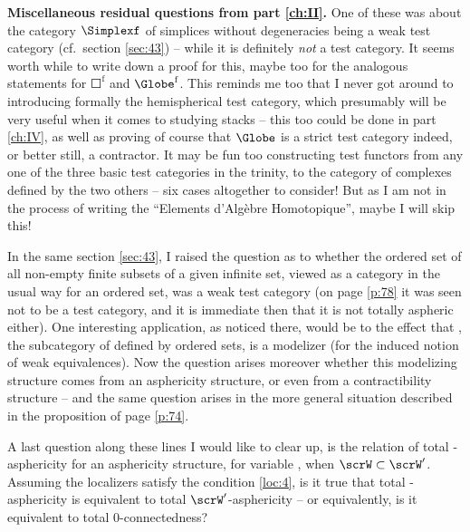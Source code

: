 \enspace\textbf{Miscellaneous residual
  questions from part \ref{ch:II}.} One of these was about the category
$\Simplexf$ of simplices without degeneracies being a weak test
category (cf.\ section \ref{sec:43}) -- while it is definitely
\emph{not} a test category. It seems worth while to write down a proof
for this, maybe too for the analogous statements for
$\Square^{\mathrm f}$ and $\Globe^{\mathrm f}$. This reminds
me too that I never got around to introducing formally the
hemispherical test category, which presumably will be very useful when
it comes to studying stacks -- this too could be done in part
\ref{ch:IV}, as well as proving of course that $\Globe$ is a strict
test category indeed, or better still, a contractor. It may be fun too
constructing test functors from any one of the three basic test
categories in the trinity, to the category of complexes defined by the
two others -- six cases altogether to consider! But as I am not in the
process of writing the ``Elements d'Algèbre
Homotopique'', maybe I will skip this!

In the same section \ref{sec:43}, I raised the question as to whether
the ordered set of all non-empty finite subsets of a given infinite
set, viewed as a category in the usual way for an ordered set, was a
weak test category (on page \ref{p:78} it was seen not to be a test
category, and it is immediate then that it is not totally aspheric
either). One interesting application, as noticed there, would be to
the effect that \Ord, the subcategory of \Cat{} defined by ordered
sets, is a modelizer (for the induced notion of weak
equivalences). Now the question arises moreover whether this
modelizing structure comes from an asphericity structure, or even from
a contractibility structure -- and the same question arises in the
more general situation described in the proposition of page
\ref{p:74}.

A last question along these lines I would like to clear up, is the
relation of total \scrW-asphericity for an asphericity structure, for
variable \scrW, when $\scrW\subset\scrW'$. Assuming the localizers
satisfy the condition \ref{loc:4}, is it true that total
\scrW-asphericity is equivalent to total $\scrW'$-asphericity -- or
equivalently, is it equivalent to total $0$-connectedness?

\bigbreak

\presectionfill{}\par

